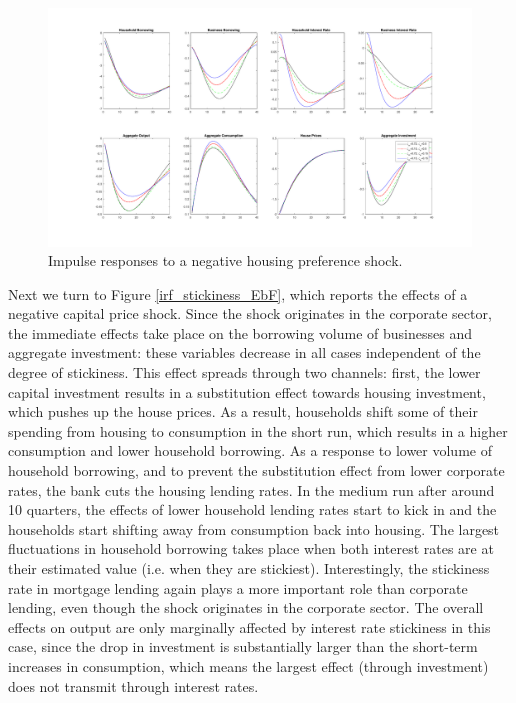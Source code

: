 \documentclass[12pt]{article}
\numberwithin{equation}{section}
\begin{document}
\begin{figure}[H]
\centering
\caption{Impulse responses to a negative housing preference shock.}
\label{irf_stickiness_J}
\includegraphics[scale=0.4]{stickinessNegativeShocksJ.pdf}
\end{figure}


Next we turn to Figure \ref{irf_stickiness_EbF}, which reports the effects of a negative capital price shock. Since the shock originates in the corporate sector, the immediate effects take place on the borrowing volume of businesses and aggregate investment: these variables decrease in all cases independent of the degree of stickiness. This effect spreads through two channels: first, the lower capital investment results in a substitution effect towards housing investment, which pushes up the house prices. As a result, households shift some of their spending from housing to consumption in the short run, which results in a higher consumption and lower household borrowing. As a response to lower volume of household borrowing, and to prevent the substitution effect from lower corporate rates, the bank cuts the housing lending rates. In the medium run after around 10 quarters, the effects of lower household lending rates start to kick in and the households start shifting away from consumption back into housing. The largest fluctuations in household borrowing takes place when both interest rates are at their estimated value (i.e. when they are stickiest). Interestingly, the stickiness rate in mortgage lending again plays a more important role than corporate lending, even though the shock originates in the corporate sector. The overall effects on output are only marginally affected by interest rate stickiness in this case, since the drop in investment is substantially larger than the short-term increases in consumption, which means the largest effect (through investment) does not transmit through interest rates. 
\end{document}

